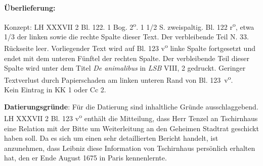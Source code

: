       
               
                \begin{ledgroupsized}[r]{120mm}
                \footnotesize 
                \pstart                
                \noindent\textbf{\"{U}berlieferung:}   
                \pend
                \end{ledgroupsized}
            
              
                            \begin{ledgroupsized}[r]{114mm}
                            \footnotesize 
                            \pstart \parindent -6mm
                            Konzept: LH XXXVII 2 Bl. 122. 1 Bog. 2\textsuperscript{o}. 1 1/2 S. zweispaltig. Bl. 122 r\textsuperscript{o}, etwa 1/3 der linken sowie die rechte Spalte dieser Text. Der verbleibende Teil N. 33. R\"{u}ckseite leer. Vorliegender Text wird auf Bl. 123 v\textsuperscript{o} linke Spalte fortgesetzt und endet mit dem unteren F\"{u}nftel der rechten Spalte. Der verbleibende Teil dieser Spalte wird unter dem Titel \textit{De animalibus} in \textit{LSB} VIII, 2 gedruckt. Geringer Textverlust durch Papierschaden am linken unteren Rand von Bl. 123~v\textsuperscript{o}.\\Kein Eintrag in KK 1 oder Cc 2.\pend
                            \end{ledgroupsized}
                \vspace*{5mm}
                \begin{ledgroup}
                \footnotesize 
                \pstart
            \noindent\footnotesize{\textbf{Datierungsgr\"{u}nde}: F\"{u}r die Datierung sind inhaltliche Gr\"{u}nde ausschlaggebend. LH XXXVII 2 Bl. 123 v\textsuperscript{o} enth\"{a}lt die Mitteilung, dass Herr Tenzel an Tschirnhaus eine Relation mit der Bitte um Weiterleitung an den Geheimen Stadtrat geschickt haben soll. Da es sich um einen sehr detaillierten Bericht handelt, ist anzunehmen, dass Leibniz diese Information von Tschirnhaus pers\"{o}nlich erhalten hat, den er Ende August 1675 in Paris kennenlernte.}
                \pend
                \end{ledgroup}
            
